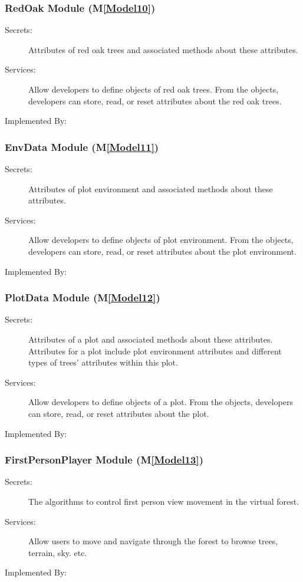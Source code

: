 \documentclass[12pt, titlepage]{article}
\newcommand{\mref}[1]{M\ref{#1}}
\begin{document}
\renewcommand\tn{red oak }
\renewcommand\TN{RedOak }
\subsubsection{\TN Module (\mref{Model10})}
\begin{description}
\item[Secrets:] Attributes of \tn trees and associated methods about these attributes.
\item[Services:] Allow developers to define objects of \tn trees. From the objects, developers can store,
read, or reset attributes about the \tn trees.
\item[Implemented By:] \progname{}
\end{description}

\subsubsection{EnvData Module (\mref{Model11})}
\begin{description}
\item[Secrets:] Attributes of plot environment and associated methods about these attributes.
\item[Services:] Allow developers to define objects of plot environment. From the objects,
 developers can store, read, or reset attributes about the plot environment.
\item[Implemented By:] \progname{}
\end{description}

\subsubsection{PlotData Module (\mref{Model12})}
\begin{description}
\item[Secrets:] Attributes of a plot and associated methods about these attributes. Attributes
for a plot include plot environment attributes and different types of trees' attributes 
within this plot.
\item[Services:] Allow developers to define objects of a plot. From the objects,
 developers can store, read, or reset attributes about the plot.
\item[Implemented By:] \progname{}
\end{description}

\subsubsection{FirstPersonPlayer Module (\mref{Model13})}
\begin{description}
\item[Secrets:] The algorithms to control first person view movement in the virtual forest.
\item[Services:] Allow users to move and navigate through the forest to browse trees, terrain,
sky. etc.
\item[Implemented By:] \progname{}
\end{description}
\end{document}
